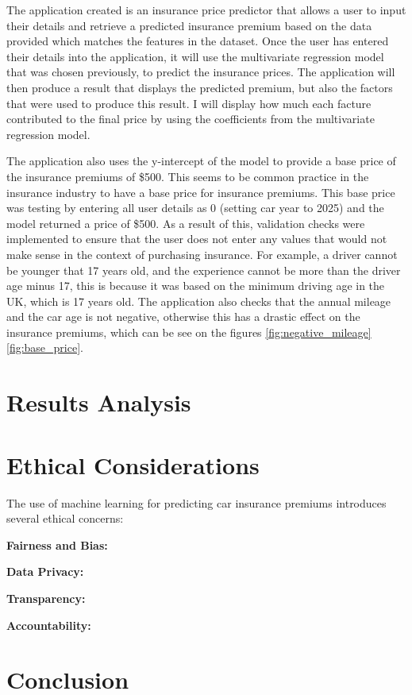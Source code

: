 \documentclass{article}
\begin{document}
The application created is an insurance price predictor that allows a user to input their details and retrieve a predicted insurance premium based on the data provided which matches the features in the dataset. Once the user has entered their details into the application, it will use the multivariate regression model that was chosen previously, to predict the insurance prices. The application will then produce a result that displays the predicted premium, but also the factors that were used to produce this result. I will display how much each facture contributed to the final price by using the coefficients from the multivariate regression model. 

The application also uses the y-intercept of the model to provide a base price of the insurance premiums of \$500. This seems to be common practice in the insurance industry to have a base price for insurance premiums. This base price was testing by entering all user details as 0 (setting car year to 2025) and the model returned a price of \$500. As a result of this, validation checks were implemented to ensure that the user does not enter any values that would not make sense in the context of purchasing insurance. For example, a driver cannot be younger that 17 years old, and the experience cannot be more than the driver age minus 17, this is because it was based on the minimum driving age in the UK, which is 17 years old. The application also checks that the annual mileage and the car age is not negative, otherwise this has a drastic effect on the insurance premiums, which can be see on the figures \ref{fig:negative_mileage} \ref{fig:base_price}.


\newpage
\section{Results Analysis}

\newpage
\section{Ethical Considerations}

The use of machine learning for predicting car insurance premiums introduces several ethical concerns:

\textbf{Fairness and Bias:} 

\textbf{Data Privacy:} 

\textbf{Transparency:} 

\textbf{Accountability:} 

\newpage
\section{Conclusion}

\newpage

\printbibliography
\end{document}
